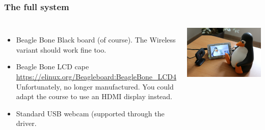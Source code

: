 \begin{frame}
  \frametitle{The full system}
  \begin{columns}
    \begin{itemize}
	\item Beagle Bone Black board (of course). The Wireless variant
	      should work fine too.
	\item Beagle Bone LCD cape\\
              \url{https://elinux.org/Beagleboard:BeagleBone_LCD4}\\
	      Unfortunately, no longer manufactured. You could adapt
	      the course to use an HDMI display instead.
        \item Standard USB webcam (supported through the 
	      driver.
    \end{itemize}
     \includegraphics[width=\textwidth]{common/beaglecam.jpg}
  \end{columns}
\end{frame}



